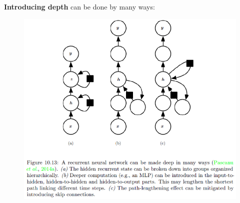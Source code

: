 \begin{multicols}{2}
	\textbf{Introducing depth} can be done by many ways:
	\begin{figure}[H]
		\centering
		\includegraphics[width=0.9\linewidth]{images/rnn.png}
	\end{figure}


\end{multicols}
